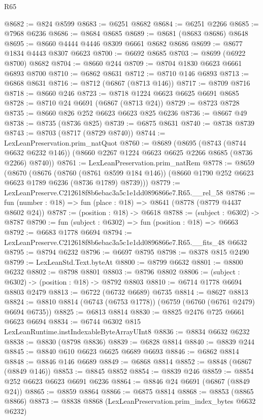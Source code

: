 \begin{lexlean}{R65}
\begin{coremodule}
{@8682 := @824 @8599
@8683 := @6251 @8682
@8684 := @6251 @2266
@8685 := @7968 @6236
@8686 := @8684 @8685
@8689 := @8681 (@8683 @8686) @8648
@8695 := @8660 @4444 @4446 @8309 @6661 @8682 @8686
@8699 := @8677 @1834 @4443 @8307 @6623
@8700 := @6692 @8685
@8703 := @8699 (@6922 @8700) @8682
@8704 := @8660 @244
@8709 := @8704 @1830 @6623 @6661 @6893 @8700
@8710 := @6862 @8631
@8712 := @8710 @146 @6893
@8713 := @6868 @8631
@8716 := @8712 (@6867 (@8713 @146))
@8717 := @8709 @8716
@8718 := @8660 @246
@8723 := @8718 @1224 @6623 @6625 @6691 @8685
@8728 := @8710 @24 @6691 (@6867 (@8713 @24))
@8729 := @8723 @8728
@8735 := @8660 @826 @252 @6623 @6623 @825 @6236
@8736 := @8667 @49
@8738 := @8735 (@8736 @825)
@8739 := @6875 @8631
@8740 := @8738 @8739
@8743 := @8703 (@8717 (@8729 @8740))
@8744 := LexLeanPreservation.prim_natQuot
@8760 := @8689
    (@8695
      (@8743 (@8744 @6632 @6232 @146))
      (@8660 @2267 @1224 @6623 @6625 @2266 @8685 (@8736 @2266) @8740))
@8761 := LexLeanPreservation.prim_natRem
@8778 := @8659
    (@8670
      (@8676
        (@8760 (@8761 @8599 @184 @146))
        (@8660 @1790 @252 @6623 @6623 @1789 @6236 (@8736 @1789) @8739)))
@8779 := LexLeanPreserve.C212618f8b6ebac3a5c1e1dd0896866e7.R65.__rel_58
@8786 := fun (number : @18) => fun (place : @18) => @8641 (@8778 (@8779 @4437 @8602 @24))
@8787 := (position : @18) -> @6618
@8788 := (subject : @6302) -> @8787
@8790 := fun (subject : @6302) => fun (position : @18) => @6663
@8792 := @6683 @1778 @6694
@8794 := LexLeanPreserve.C212618f8b6ebac3a5c1e1dd0896866e7.R65.__fits_48 @6632
@8795 := @8794 @6232
@8796 := @6697 @8795
@8798 := @8378 @815 @2490
@8799 := LexLeanStd.Text.byteAt
@8800 := @8799 @6632
@8801 := @8800 @6232
@8802 := @8798 @8801
@8803 := @8796 @8802
@8806 := (subject : @6302) -> (position : @18) -> @8792 @8803
@8810 := @6714 @1778 @6694 @8803 @2479
@8813 := @6722 (@6732 @6689) @6735
@8814 := @8627 @8813
@8824 := @8810 @8814 (@6743 (@6753 @1778)) (@6759 (@6760 (@6761 @2479) @6694 @6735))
@8825 := @6813 @8814
@8830 := @8825 @2476 @725 @6661 @6623 @6694
@8834 := @6744 @6302 @815 LexLeanRuntime.instIndexableByteArrayUInt8
@8836 := @8834 @6632 @6232
@8838 := @8830 (@8798 @8836)
@8839 := @6828 @8814
@8840 := @8839 @244
@8845 := @8840 @610 @6623 @6625 @6689 @6693
@8846 := @6862 @8814
@8848 := @8846 @146 @6689
@8849 := @6868 @8814
@8852 := @8848 (@6867 (@8849 @146))
@8853 := @8845 @8852
@8854 := @8839 @246
@8859 := @8854 @252 @6623 @6623 @6691 @6236
@8864 := @8846 @24 @6691 (@6867 (@8849 @24))
@8865 := @8859 @8864
@8866 := @6875 @8814
@8868 := @8853 (@8865 @8866)
@8873 := @8838 @8868 (LexLeanPreservation.prim_index_bytes @6632 @6232)
}
\end{coremodule}
\end{lexlean}
